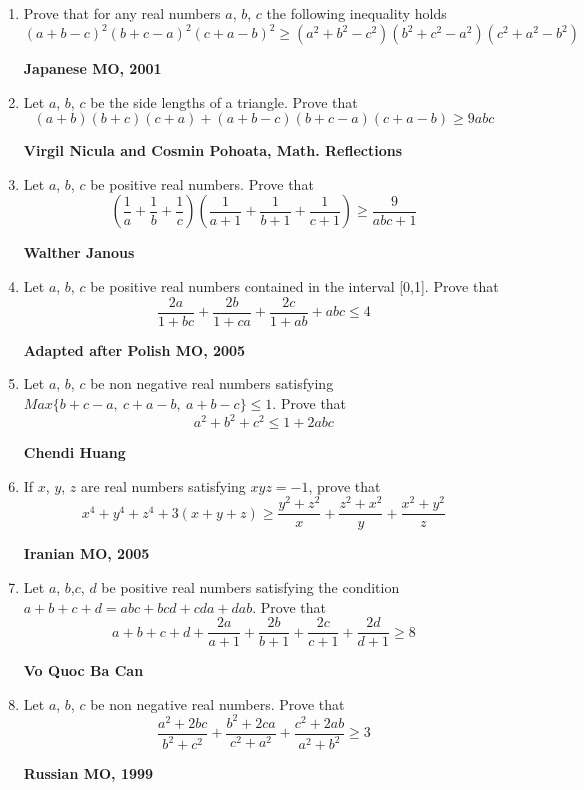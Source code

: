 \documentclass{article}
\begin{document}
\begin{enumerate}
\item Prove that for any real numbers $a $, $b $, $c $ the following inequality holds  $$(a+b-c)^2(b+c-a)^2(c+a-b)^2\geq (a^2+b^2-c^2)(b^2+c^2-a^2)  ( c^2+a^2-b^2)$$
\begin {flushright}
\textbf{Japanese MO, 2001}
\end{flushright}
\item Let $a$, $b$, $c$ be the side lengths of a triangle. Prove that $$(a+b)(b+c)(c+a)+(a+b-c)(b+c-a)(c+a-b)\geq 9abc $$
\begin {flushright}
\textbf{Virgil Nicula and Cosmin Pohoata, Math. Reflections}
\end{flushright}
\item Let $a$, $b$, $c$ be positive real numbers. Prove that $$\left (\frac {1}{a}+\frac {1}{b}+\frac {1}{c} \right )\left (\frac {1}{a+1}+\frac {1}{b+1}+\frac {1}{c+1} \right )\geq \frac{9}{abc+1}$$
\begin {flushright}
\textbf{Walther Janous}
\end{flushright}
\item Let $a$, $b$, $c$ be positive real numbers contained in the interval [0,1]. Prove that $$\frac{2a}{1+bc}+\frac{2b}{1+ca}+\frac{2c}{1+ab}+abc\leq 4$$
\begin {flushright}
\textbf{Adapted after Polish MO, 2005}
\end{flushright}
\item Let $a$, $b$, $c$ be non negative real numbers satisfying  $Max\{b+c-a,\ c+a-b,\ a+b-c \}\leq 1$. Prove that  $$a^2+b^2+c^2\leq 1+2abc$$
\begin {flushright}
\textbf{Chendi Huang}
\end{flushright}
\item If $x $, $y $, $z $ are real numbers satisfying  $xyz=-1$, prove that $$x^4+y^4+z^4+3 (x+y+z)\geq \frac {y^2+z^2}{x}+\frac {z^2+x^2}{y}+\frac {x^2+y^2}{z}$$
\begin {flushright}
\textbf{Iranian MO, 2005}
\end{flushright}
\item Let $a $, $b $,$c $, $d $ be positive real numbers satisfying the condition  $a+b+c+d=abc+bcd+cda+dab $. Prove that  $$a+b+c+d+\frac {2a}{a+1}+\frac {2b}{b+1}+\frac {2c}{c+1}+\frac {2d}{d+1}\geq 8$$
\begin {flushright}
\textbf{Vo Quoc Ba Can}
\end{flushright}
\item Let $a$, $b$, $c$ be non negative real numbers. Prove that $$\frac {a^2+2bc}{b^2+c^2}+\frac {b^2+2ca}{c^2+a^2}+\frac {c^2+2ab}{a^2+b^2}\geq 3$$
\begin {flushright}
\textbf{Russian MO, 1999}
\end{flushright}
\pagebreak 


\end{enumerate}
\end{document}
